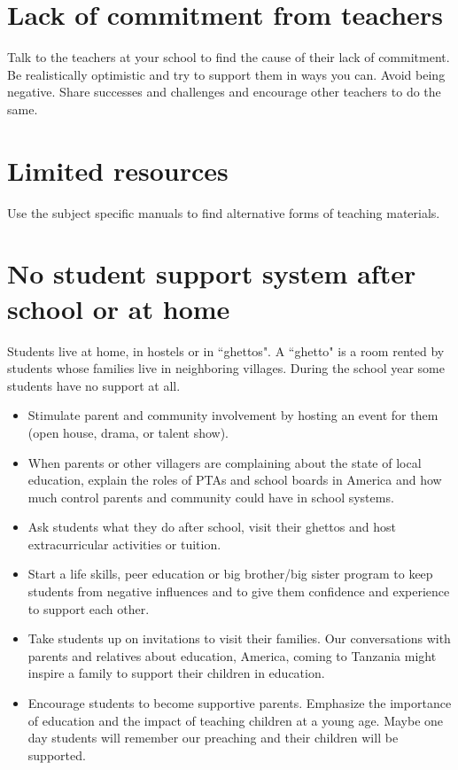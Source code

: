 \section{Lack of commitment from teachers}
Talk to the teachers at your school to find the cause of their lack of
commitment.  Be realistically optimistic and try to support them in
ways you can.  Avoid being negative.  Share successes and challenges
and encourage other teachers to do the same.

\section{Limited resources}
Use the subject specific manuals to find alternative forms of teaching materials. 

\section{No student support system after school or at home}
Students live at home, in hostels or in ``ghettos".  A ``ghetto" is a
room rented by students whose families live in neighboring villages.
During the school year some students have no support at all.
\begin{itemize}
\item Stimulate parent and community involvement by hosting an event for
them (open house, drama, or talent show).
\item When parents or other villagers are complaining about the state of
local education, explain the roles of PTAs and school boards in
America and how much control parents and community could have in
school systems.
\item Ask students what they do after school, visit their ghettos and host
extracurricular activities or tuition.
\item Start a life skills, peer education or big brother/big sister
program to keep students from negative influences and to give them
confidence and experience to support each other.
\item Take students up on invitations to visit their families.  Our
conversations with parents and relatives about education, America,
coming to Tanzania might inspire a family to support their children in
education.
\item Encourage students to become supportive parents.  Emphasize the
importance of education and the impact of teaching children at a young
age.  Maybe one day students will remember our preaching and their
children will be supported.
\end{itemize}

